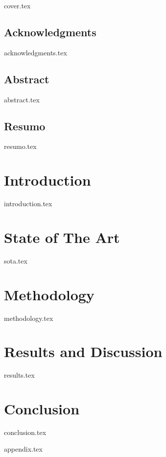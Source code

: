 \documentclass[a4paper, 12pt]{report}
\begin{document}
{cover.tex}
\newpage
\printglossary[type=\acronymtype, nonumberlist]

\newpage
\listoffigures

\newpage
\listoftables

\newpage
\tableofcontents
\frontmatter
\vspace*{50pt}
\section*{\Huge{Acknowledgments}}
{acknowledgments.tex}
\vspace{40pt}

\newpage
\vspace*{50pt}
\section*{\Huge{Abstract}}
\vspace{40pt}
{abstract.tex}

\newpage
\vspace*{50pt}
\section*{\Huge{Resumo}}
\vspace{40pt}
{resumo.tex}

\mainmatter


\newpage
\chapter{Introduction}
{introduction.tex}

\newpage
\chapter{State of The Art}
{sota.tex}

\newpage
\chapter{Methodology}
{methodology.tex}

\newpage
\chapter{Results and Discussion}
{results.tex}

\newpage
\chapter{Conclusion}
{conclusion.tex}

\newpage
\printbibliography

\newpage
{appendix.tex}
\end{document}
